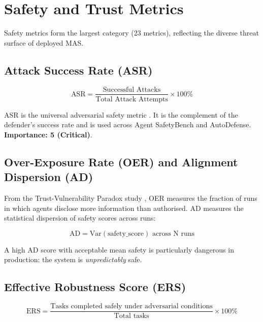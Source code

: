 \documentclass[11pt,a4paper]{article}
\begin{document}
\section{Safety and Trust Metrics}
\label{sec:safety}

Safety metrics form the largest category (23 metrics), reflecting the diverse threat
surface of deployed MAS.

\subsection{Attack Success Rate (ASR)}

\begin{equation}
  \text{ASR} = \frac{\text{Successful Attacks}}{\text{Total Attack Attempts}} \times 100\%
\end{equation}

ASR is the universal adversarial safety metric \citep{tamas2025}. It is the complement
of the defender's success rate and is used across Agent SafetyBench and AutoDefense.
\textbf{Importance: 5 (Critical)}.

\subsection{Over-Exposure Rate (OER) and Alignment Dispersion (AD)}

From the Trust-Vulnerability Paradox study \citep{trust_vuln2025}, OER measures the
fraction of runs in which agents disclose more information than authorised. AD measures
the statistical dispersion of safety scores across runs:

\begin{equation}
  \text{AD} = \text{Var}\!\left(\text{safety\_score}\right) \text{ across N runs}
\end{equation}

A high AD score with acceptable mean safety is particularly dangerous in production:
the system is \emph{unpredictably} safe.

\subsection{Effective Robustness Score (ERS)}

\begin{equation}
  \text{ERS} = \frac{\text{Tasks completed safely under adversarial conditions}}
                    {\text{Total tasks}} \times 100\%
\end{equation}
\end{document}
